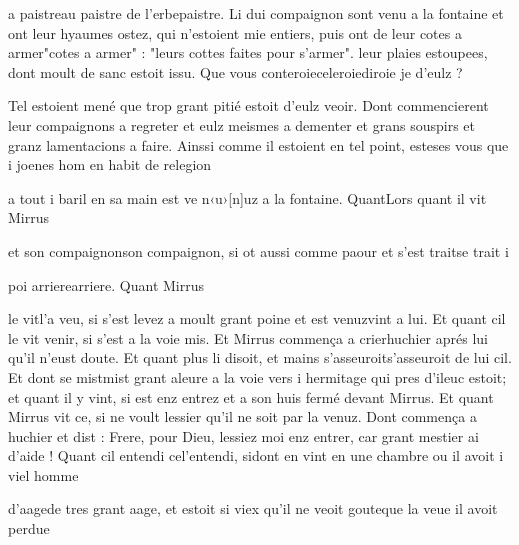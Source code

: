 \documentclass{article}
\begin{document}
\begin{pages}
                  a paistreau paistre de l'erbepaistre. Li dui compaignon sont venu a la fontaine et ont leur hyaumes ostez, qui
               n’estoient mie entiers, 
                  puis ont de leur cotes a armer"cotes a armer" : "leurs cottes faites pour s'armer". leur plaies
                     estoupees, dont moult de sanc estoit issu. Que vous 
                     conteroieceleroiediroie je d’eulz ?
               
                  Tel estoient mené que trop grant pitié estoit d’eulz veoir. Dont commencierent
               leur compaignons a regreter et eulz meismes a dementer 
                  et grans souspirs et granz lamentacions a faire. Ainssi comme il estoient en tel
               point, 
                  esteses vous que i
               joenes hom en habit de relegion
               
                  a tout
               i baril en sa main est ve
                  n‹u›[n]uz a la fontaine. 
                  QuantLors quant il vit Mirrus
               
                  et son compaignonson compaignon, si ot aussi comme paour et 
                  s’est traitse trait
               i
               
                  poi arrierearriere. Quant Mirrus
               
                  le vitl'a veu, si s’est levez a moult grant poine et 
                  est venuzvint a lui. Et quant cil le vit venir, si s’est a la voie mis. Et Mirrus commença a 
                  crierhuchier aprés lui qu’il n’eust doute. Et
               quant plus li disoit, et mains
                  s’asseuroits'asseuroit de lui cil. Et dont se 
                  mistmist grant aleure
               a la voie vers i
               hermitage qui pres d’ileuc estoit; et
               quant il y vint, si est enz entrez et a son huis fermé devant Mirrus. Et quant Mirrus vit ce, si
               ne voult lessier qu’il ne soit par la venuz. \pend
            \pstart Dont commença a huchier et dist : Frere, pour Dieu, lessiez moi enz entrer, car grant mestier ai
                  d’aide ! Quant cil 
                  entendi cel'entendi, 
                  sidont en vint en une chambre ou il avoit i
               viel homme
               
                  d’aagede tres grant aage, et estoit si viex 
                  qu’il ne veoit gouteque la veue il avoit perdue
               

\end{pages}
\end{document}
